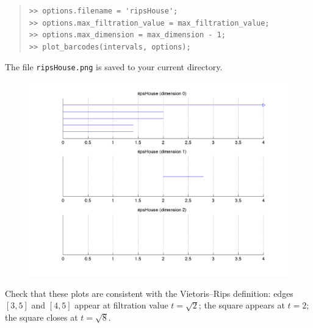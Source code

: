\documentclass[amscd, amssymb, verbatim]{amsart}[12pt]
\theoremstyle{remark}
\newtheorem{exercise}{Exercise}
\theoremstyle{remark}
\theoremstyle{remark}
\begin{document}
\begin{quote} \begin{verbatim}
>> options.filename = 'ripsHouse';
>> options.max_filtration_value = max_filtration_value;
>> options.max_dimension = max_dimension - 1;
>> plot_barcodes(intervals, options);
\end{verbatim} \end{quote}

The file \texttt{ripsHouse.png} is saved to your current directory.

\begin{figure}[htp]
	\begin{center}
    	\includegraphics[width=6in]{ripsHouse.png}
   	\end{center}
\end{figure}
\FloatBarrier

Check that these plots are consistent with the Vietoris--Rips definition: edges $[3,5]$ and $[4,5]$ appear at filtration value $t = \sqrt{2}$; the square appears at $t = 2$; the square closes at $t = \sqrt{8}$. 

%
%
\end{document}
